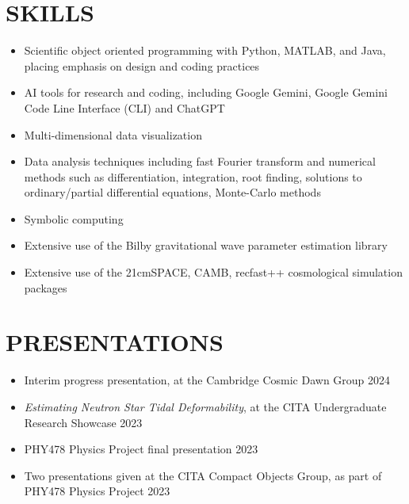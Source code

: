 \documentclass[a4paper,10pt]{extarticle}
\begin{document}
\section*{SKILLS}
\begin{itemize}
    \item Scientific object oriented programming with Python, MATLAB, and Java, placing emphasis on design and coding practices

    \item AI tools for research and coding, including Google Gemini, Google Gemini Code Line Interface (CLI) and ChatGPT

    \item Multi-dimensional data visualization

    \item Data analysis techniques including fast Fourier transform and numerical methods such as differentiation, integration, root finding, solutions to ordinary/partial differential equations, Monte-Carlo methods

    \item Symbolic computing

    \item Extensive use of the Bilby gravitational wave parameter estimation library

    \item Extensive use of the 21cmSPACE, CAMB, recfast++ cosmological simulation packages
\end{itemize}

\section*{PRESENTATIONS}
\begin{itemize}
    \item Interim progress presentation, at the Cambridge Cosmic Dawn Group \hfill 2024

    \item \textit{Estimating Neutron Star Tidal Deformability}, at the CITA Undergraduate Research Showcase \hfill 2023

    \item PHY478 Physics Project final presentation \hfill 2023

    \item Two presentations given at the CITA Compact Objects Group, as part of PHY478 Physics Project \hfill 2023
\end{itemize}
\end{document}
